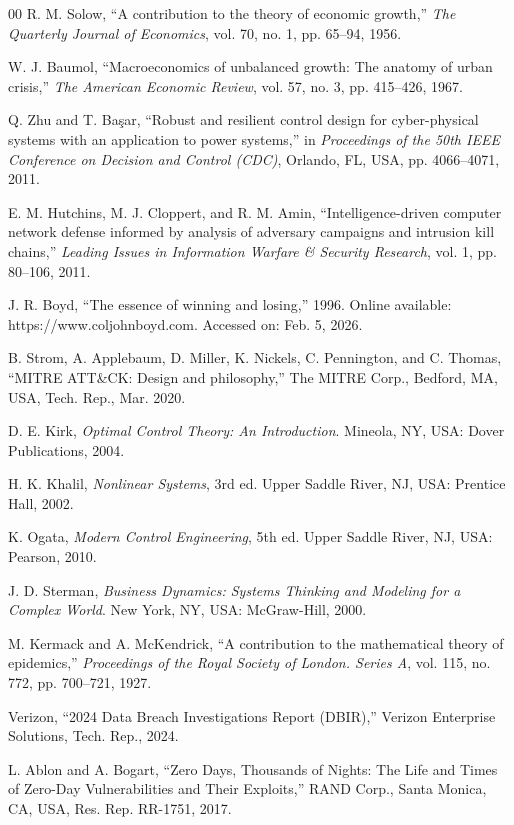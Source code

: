 ﻿\documentclass[lettersize,journal]{IEEEtran}
\begin{document}
\begin{thebibliography}{00}
R. M. Solow, “A contribution to the theory of economic growth,” \textit{The Quarterly Journal of Economics}, vol. 70, no. 1, pp. 65–94, 1956.

W. J. Baumol, “Macroeconomics of unbalanced growth: The anatomy of urban crisis,” \textit{The American Economic Review}, vol. 57, no. 3, pp. 415–426, 1967.

Q. Zhu and T. Ba\c{s}ar, “Robust and resilient control design for cyber-physical systems with an application to power systems,” in \textit{Proceedings of the 50th IEEE Conference on Decision and Control (CDC)}, Orlando, FL, USA, pp. 4066–4071, 2011.

E. M. Hutchins, M. J. Cloppert, and R. M. Amin, “Intelligence-driven computer network defense informed by analysis of adversary campaigns and intrusion kill chains,” \textit{Leading Issues in Information Warfare \& Security Research}, vol. 1, pp. 80–106, 2011.

J. R. Boyd, “The essence of winning and losing,” 1996. Online available: https://www.coljohnboyd.com. Accessed on: Feb. 5, 2026.

B. Strom, A. Applebaum, D. Miller, K. Nickels, C. Pennington, and C. Thomas, “MITRE ATT\&CK: Design and philosophy,” The MITRE Corp., Bedford, MA, USA, Tech. Rep., Mar. 2020.

D. E. Kirk, \textit{Optimal Control Theory: An Introduction}. Mineola, NY, USA: Dover Publications, 2004.

H. K. Khalil, \textit{Nonlinear Systems}, 3rd ed. Upper Saddle River, NJ, USA: Prentice Hall, 2002.

K. Ogata, \textit{Modern Control Engineering}, 5th ed. Upper Saddle River, NJ, USA: Pearson, 2010.

J. D. Sterman, \textit{Business Dynamics: Systems Thinking and Modeling for a Complex World}. New York, NY, USA: McGraw-Hill, 2000.

M. Kermack and A. McKendrick, “A contribution to the mathematical theory of epidemics,” \textit{Proceedings of the Royal Society of London. Series A}, vol. 115, no. 772, pp. 700–721, 1927.

Verizon, “2024 Data Breach Investigations Report (DBIR),” Verizon Enterprise Solutions, Tech. Rep., 2024.

L. Ablon and A. Bogart, “Zero Days, Thousands of Nights: The Life and Times of Zero-Day Vulnerabilities and Their Exploits,” RAND Corp., Santa Monica, CA, USA, Res. Rep. RR-1751, 2017.


\end{thebibliography}
\end{document}
